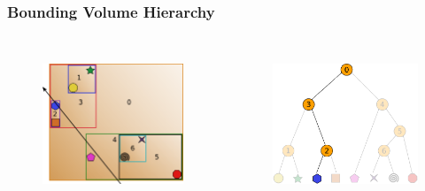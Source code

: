 \documentclass{beamer}
\begin{document}
\begin{frame}
  \frametitle{Bounding Volume Hierarchy}
  
\begin{columns}[t]

\begin{figure}
\includegraphics[height=45mm]{primitive-box-ray.png}
\end{figure}

\begin{figure}
\includegraphics[height=45mm]{elim_2.png}
\end{figure}
\end{columns}
\end{frame}

\end{document}
